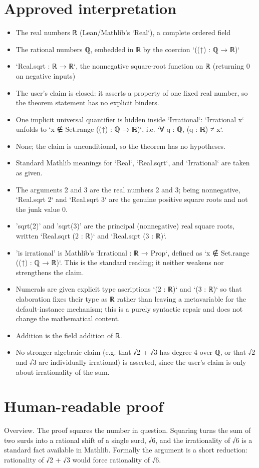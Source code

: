 \documentclass[11pt]{article}
\begin{document}
\section*{Approved interpretation}
\begin{itemize}
\item The real numbers ℝ (Lean/Mathlib's `Real`), a complete ordered field
\item The rational numbers ℚ, embedded in ℝ by the coercion `((↑) : ℚ → ℝ)`
\item `Real.sqrt : ℝ → ℝ`, the nonnegative square-root function on ℝ (returning 0 on negative inputs)
\item The user's claim is closed: it asserts a property of one fixed real number, so the theorem statement has no explicit binders.
\item One implicit universal quantifier is hidden inside `Irrational`: `Irrational x` unfolds to `x ∉ Set.range ((↑) : ℚ → ℝ)`, i.e. `∀ q : ℚ, (q : ℝ) ≠ x`.
\item None; the claim is unconditional, so the theorem has no hypotheses.
\item Standard Mathlib meanings for `Real`, `Real.sqrt`, and `Irrational` are taken as given.
\item The arguments 2 and 3 are the real numbers 2 and 3; being nonnegative, `Real.sqrt 2` and `Real.sqrt 3` are the genuine positive square roots and not the junk value 0.
\item 'sqrt(2)' and 'sqrt(3)' are the principal (nonnegative) real square roots, written `Real.sqrt (2 : ℝ)` and `Real.sqrt (3 : ℝ)`.
\item 'is irrational' is Mathlib's `Irrational : ℝ → Prop`, defined as `x ∉ Set.range ((↑) : ℚ → ℝ)`. This is the standard reading; it neither weakens nor strengthens the claim.
\item Numerals are given explicit type ascriptions `(2 : ℝ)` and `(3 : ℝ)` so that elaboration fixes their type as ℝ rather than leaving a metavariable for the default-instance mechanism; this is a purely syntactic repair and does not change the mathematical content.
\item Addition is the field addition of ℝ.
\item No stronger algebraic claim (e.g. that √2 + √3 has degree 4 over ℚ, or that √2 and √3 are individually irrational) is asserted, since the user's claim is only about irrationality of the sum.
\end{itemize}

\section*{Human-readable proof}
Overview. The proof squares the number in question. Squaring turns the sum of two surds into a rational shift of a single surd, √6, and the irrationality of √6 is a standard fact available in Mathlib. Formally the argument is a short reduction: rationality of √2 + √3 would force rationality of √6.
\end{document}
